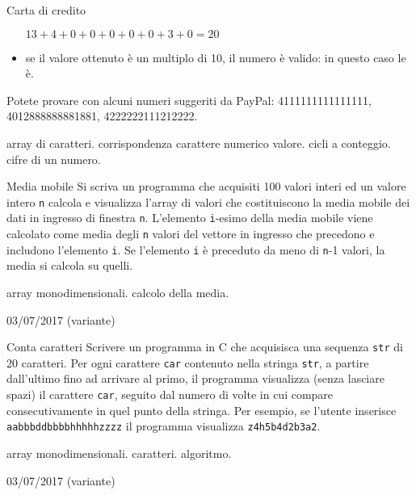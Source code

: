 \begin{exrev}{Carta di credito}
\begin{itemize}
$13 + 4 + 0 + 0 + 0 + 0 + 0 + 3 + 0 = 20$

\item se il valore ottenuto \`e un multiplo di 10, il numero \`e valido: in questo caso le \`e.
\end{itemize}

Potete provare con alcuni numeri suggeriti da PayPal: 4111111111111111, 4012888888881881, 4222222111212222.

\begin{tags}
array di caratteri. corrispondenza carattere numerico valore. cicli a conteggio. cifre di un numero.
\end{tags}
\end{exrev}

\begin{exrev}{Media mobile}
Si scriva un programma che acquisiti 100 valori interi ed un valore intero \texttt{n} calcola e visualizza l'array di valori che costituiscono la media mobile dei dati in ingresso di finestra \texttt{n}. L'elemento \texttt{i}-esimo della media mobile viene calcolato come media degli \texttt{n} valori del vettore in ingresso che precedono e includono l'elemento \texttt{i}. Se l'elemento \texttt{i} \`e preceduto da meno di \texttt{n}-1 valori, la media si calcola su quelli.


\begin{tags}
array monodimensionali. calcolo della media.
\end{tags}

\begin{esame}
03/07/2017 (variante)
\end{esame}

\end{exrev}

\begin{exrev}{Conta caratteri}
Scrivere un programma in C che acquisisca una sequenza \texttt{str} di 20 caratteri. Per ogni carattere \texttt{car} contenuto nella stringa \texttt{str}, a partire dall'ultimo fino ad arrivare al primo, il programma visualizza (senza lasciare spazi) il carattere \texttt{car}, seguito dal numero di volte in cui compare consecutivamente in quel punto della stringa. Per esempio, se l'utente inserisce \texttt{aabbbddbbbbhhhhhzzzz} il programma visualizza \texttt{z4h5b4d2b3a2}.


\begin{tags}
array monodimensionali. caratteri. algoritmo.
\end{tags}

\begin{esame}
03/07/2017 (variante)
\end{esame}





\end{exrev}


